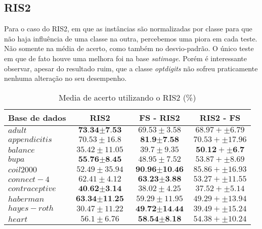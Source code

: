 \documentclass[a4paper, 12pt]{article}
\begin{document}
\subsection{RIS2}
Para o caso do RIS2, em que as instâncias são normalizadas por classe para que não haja influência de uma classe na outra, percebemos uma piora em cada teste. Não somente na média de acerto, como também no desvio-padrão. O único teste em que de fato houve uma melhora foi na base \textit{satimage}. Porém é interessante observar, apesar do resultado ruim, que a classe \textit{optdigits} não sofreu praticamente nenhuma alteração no seu desempenho.
\begin{table}[h!]
  \begin{center}
    \caption{Media de acerto utilizando o RIS2 (\%)}
    \label{tab:table4}
    \begin{tabular}{l|c|c|c}
      \textbf{Base de dados} & \textbf{ RIS2 } & \textbf{FS - RIS2} & \textbf{RIS2 - FS}\\
        \hline
        $adult$ & $\textbf{73.34} \pm \textbf{7.53}$  & $69.53 \pm 3.58$ & $68.97 +  \pm 6.79$ \\
        \hline
        $appendicitis$ & $70.53 \pm 16.8$  & $\textbf{81.9} \pm \textbf{7.58}$ & $70.53 +  \pm 17.96$ \\
        \hline
        $balance$ & $35.42 \pm 11.05$  & $39.7 \pm 9.35$ & $\textbf{50.12} +  \pm \textbf{6.7}$ \\
        \hline
        $bupa$ & $\textbf{55.76} \pm \textbf{8.45}$  & $48.95 \pm 7.52$ & $53.87 +  \pm 8.69$ \\
        \hline
        $coil2000$ & $52.49 \pm 35.94$  & $\textbf{90.96} \pm \textbf{10.46}$ & $85.86 +  \pm 16.93$ \\
        \hline
        $connect-4$ & $62.41 \pm 4.12$  & $\textbf{63.23} \pm \textbf{3.88}$ & $53.27 +  \pm 11.55$ \\
        \hline
        $contraceptive$ & $\textbf{40.62} \pm \textbf{3.14}$  & $38.02 \pm 4.25$ & $37.52 +  \pm 5.14$ \\
        \hline
        $haberman$ & $\textbf{63.34} \pm \textbf{11.25}$  & $59.29 \pm 11.95$ & $49.29 +  \pm 13.94$ \\
        \hline
        $hayes-roth$ & $30.47 \pm 11.22$  & $\textbf{49.72} \pm \textbf{14.44}$ & $39.49 +  \pm 15.24$ \\
        \hline
        $heart$ & $56.1 \pm 6.76$  & $\textbf{58.54} \pm \textbf{8.18}$ & $54.38 +  \pm 10.24$ \\
        \hline

\end{tabular}
\end{center}
\end{table}
\end{document}
